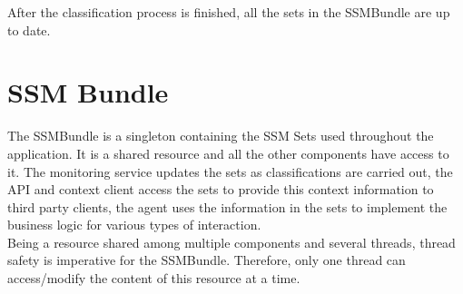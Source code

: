 After the classification process is finished, all the sets in the SSMBundle are up to date.

\section{SSM Bundle} %
\label{subsec:impl_ssm_bundle}
The SSMBundle is a singleton containing the SSM Sets used throughout the application. It is a shared resource and all the other components have access to it. The monitoring service updates the sets as classifications are carried out, the API and context client access the sets to provide this context information to third party clients, the agent uses the information in the sets to implement the business logic for various types of interaction.\\

Being a resource shared among multiple components and several threads, thread safety is imperative for the SSMBundle. Therefore, only one thread can access/modify the content of this resource at a time.

